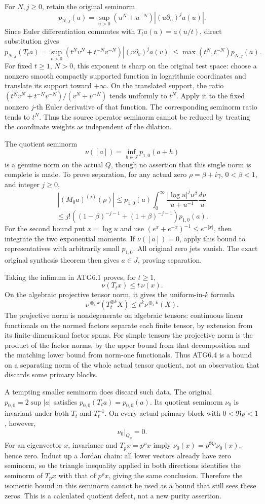 For \(N,j\ge0\), retain the original seminorm \[
p_{N,j}(a)=\sup_{u>0}(u^N+u^{-N})|(u\partial_u)^ja(u)|.
\] Since Euler differentiation commutes with \(T_ta(u)=a(u/t)\), direct
substitution gives \[
p_{N,j}(T_ta)
=\sup_{v>0}(t^Nv^N+t^{-N}v^{-N})|(v\partial_v)^ja(v)|
\le \max(t^N,t^{-N})p_{N,j}(a).
\tag{ATG6.1}
\] For fixed \(t\ge1\), \(N>0\), this exponent is sharp on the original
test space: choose a nonzero smooth compactly supported function in
logarithmic coordinates and translate its support toward \(+\infty\). On
the translated support, the ratio \((t^Nv^N+t^{-N}v^{-N})/(v^N+v^{-N})\)
tends uniformly to \(t^N\). Apply it to the fixed nonzero \(j\)-th Euler
derivative of that function. The corresponding seminorm ratio tends to
\(t^N\). Thus the source operator seminorm cannot be reduced by treating
the coordinate weights as independent of the dilation.

The quotient seminorm \[
\nu([a])=\inf_{h\in J}p_{1,0}(a+h)
\tag{ATG6.2}
\] is a genuine norm on the actual \(Q\), though no assertion that this
single norm is complete is made. To prove separation, for any actual
zero \(\rho=\beta+i\gamma\), \(0<\beta<1\), and integer \(j\ge0\), \[
|(M_0a)^{(j)}(\rho)|
\le p_{1,0}(a)
 \int_0^\infty\frac{|\log u|^j u^\beta}{u+u^{-1}}\frac{du}{u}
\] \[
\le j!\left((1-\beta)^{-j-1}+(1+\beta)^{-j-1}\right)p_{1,0}(a).
\tag{ATG6.3}
\] For the second bound put \(x=\log u\) and use
\((e^x+e^{-x})^{-1}\le e^{-|x|}\), then integrate the two exponential
moments. If \(\nu([a])=0\), apply this bound to representatives with
arbitrarily small \(p_{1,0}\). All original zero jets vanish. The exact
original synthesis theorem then gives \(a\in J\), proving separation.

Taking the infimum in ATG6.1 proves, for \(t\ge1\), \[
\nu(T_t x)\le t\,\nu(x).
\] On the algebraic projective tensor norm, it gives the
uniform-in-\(k\) formula \[
\boxed{\nu^{\otimes_\pi k}(T_t^{\otimes k}X)
 \le t^k\nu^{\otimes_\pi k}(X).}
\tag{ATG6.4}
\] The projective norm is nondegenerate on algebraic tensors: continuous
linear functionals on the normed factors separate each finite tensor, by
extension from its finite-dimensional factor spans. For simple tensors
the projective norm is the product of the factor norms, by the upper
bound from that decomposition and the matching lower bound from norm-one
functionals. Thus ATG6.4 is a bound on a separating norm of the whole
actual tensor quotient, not an observation that discards some primary
blocks.

A tempting smaller seminorm does discard such data. The original
\(p_{0,0}=2\sup|a|\) satisfies \(p_{0,0}(T_ta)=p_{0,0}(a)\). Its
quotient seminorm \(\nu_0\) is invariant under both \(T_t\) and
\(T_t^{-1}\). On every actual primary block with \(0<\Re\rho<1\),
however, \[
\nu_0|_{Q_\rho}=0.
\tag{ATG6.5}
\] For an eigenvector \(x\), invariance and \(T_px=p^\rho x\) imply
\(\nu_0(x)=p^{\Re\rho}\nu_0(x)\), hence zero. Induct up a Jordan chain:
all lower vectors already have zero seminorm, so the triangle inequality
applied in both directions identifies the seminorm of \(T_px\) with that
of \(p^\rho x\), giving the same conclusion. Therefore the isometric
bound in this seminorm cannot be used as a bound that still sees these
zeros. This is a calculated quotient defect, not a new purity assertion.

